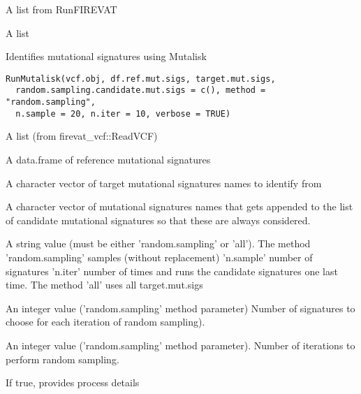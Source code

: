 \documentclass[letterpaper]{book}
\begin{document}
%
\begin{Arguments}
\begin{ldescription}
\item[\code{data}] A list from RunFIREVAT
\end{ldescription}
\end{Arguments}
%
\begin{Value}
A list
\end{Value}
%
\begin{Description}\relax
Identifies mutational signatures using Mutalisk
\end{Description}
%
\begin{Usage}
\begin{verbatim}
RunMutalisk(vcf.obj, df.ref.mut.sigs, target.mut.sigs,
  random.sampling.candidate.mut.sigs = c(), method = "random.sampling",
  n.sample = 20, n.iter = 10, verbose = TRUE)
\end{verbatim}
\end{Usage}
%
\begin{Arguments}
\begin{ldescription}
\item[\code{vcf.obj}] A list (from firevat\_vcf::ReadVCF)

\item[\code{df.ref.mut.sigs}] A data.frame of reference mutational signatures

\item[\code{target.mut.sigs}] A character vector of target mutational signatures names to identify from

\item[\code{random.sampling.candidate.mut.sigs}] A character vector of mutational signatures names
that gets appended to the list of candidate mutational signatures so that these are
always considered.

\item[\code{method}] A string value (must be either 'random.sampling' or 'all').
The method 'random.sampling' samples (without replacement) 'n.sample' number of signatures
'n.iter' number of times and runs the candidate signatures one last time.
The method 'all' uses all target.mut.sigs

\item[\code{n.sample}] An integer value ('random.sampling' method parameter)
Number of signatures to choose for each iteration of random sampling).

\item[\code{n.iter}] An integer value ('random.sampling' method parameter).
Number of iterations to perform random sampling.

\item[\code{verbose}] If true, provides process details
\end{ldescription}
\end{Arguments}
\end{document}
